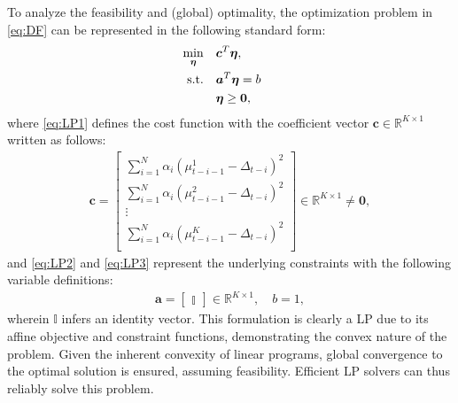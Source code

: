 To analyze the feasibility and  (global) optimality, the optimization problem in \eqref{eq:DF} can be represented in the following standard form:
%
\begin{subequations} \label{eq:LP}
\begin{align}
	\minimize_{\boldsymbol{{\eta}}}\quad & \boldsymbol{c}^{T}{\boldsymbol{\eta}} \label{eq:LP1}  , \\
   	\textrm{s.t.} \quad & \boldsymbol{a}^{T}  {\boldsymbol{\eta}}  = b \  &   \label{eq:LP2} \\
    &  \boldsymbol{{\eta}} \geq \boldsymbol{0}, \label{eq:LP3} 
\end{align}
\end{subequations}
%
where \eqref{eq:LP1} defines the cost function with the coefficient vector $\bm{c} \in\mathbb{R}^{K\times 1}$ written as follows:  
 \begin{align*}
    \mathbf{c} = 
      \begin{bmatrix} 
        \sum_{i = 1}^{N} \alpha_i(\mu^1_{t-i-1} - \Delta_{t-i})^2 \\
        \sum_{i = 1}^{N} \alpha_i(\mu^2_{t-i-1} - \Delta_{t-i})^2 \\
        \vdots \\
        \sum_{i = 1}^{N} \alpha_i(\mu^K_{t-i-1} - \Delta_{t-i})^2 \\
      \end{bmatrix} \in\mathbb{R}^{K\times 1}  \neq \mathbf{0},
 \end{align*}
and \eqref{eq:LP2} and \eqref{eq:LP3} represent the underlying constraints with the following variable definitions:
\begin{align*}
    \boldsymbol{a} = \begin{bmatrix} 
      \mathbb{I} 
    \end{bmatrix} \in\mathbb{R}^{K\times 1} , \quad
    b = 1,
\end{align*}
wherein $\mathbb{I}$ infers an identity vector. This formulation is clearly a \ac{LP} due to its affine objective and constraint functions, demonstrating the convex nature of the problem.
%
Given the inherent convexity of linear programs, global convergence to the optimal solution is ensured, assuming feasibility. Efficient \ac{LP} solvers can thus reliably solve this problem.


